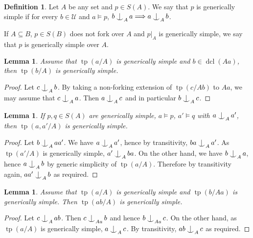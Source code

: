 \documentclass{amsart}
\makeatletter
\numberwithin{equation}{section}
\newtheorem{lemme}[thm]{Lemma}
\theoremstyle{definition}
\newtheorem{defi}[thm]{Definition}
\theoremstyle{mystyle}
\theoremstyle{remark}
\newcommand{\monster}{\mathcal U}
\DeclareMathOperator{\tp}{tp}
\DeclareMathOperator{\dcl}{dcl}
\def\indsym#1#2{%
 \setbox0=\hbox{$\m@th#1x$}%
 \kern\wd0%
 \hbox to 0pt{\hss$\m@th#1\mid$\hbox to 0pt{$\m@th#1^{#2}$\hss}\hss}%
 \lower.9\ht0\hbox to 0pt{\hss$\m@th#1\smile$\hss}%
 \kern\wd0}
\newcommand{\ind}[1][]{\mathop{\mathpalette\indsym{#1}}}
\makeatother
\begin{document}
\begin{defi}
Let $A$ be any set and $p\in S(A)$. We say that $p$ is generically simple if for every $b\in \monster$ and $a\models p$, $b\ind_{A} a \Longrightarrow a \ind_A b$.
\end{defi}

If $A\subseteq B$, $p\in S(B)$ does not fork over $A$ and $p|_A$ is generically simple, we say that $p$ is generically simple over $A$.

\begin{lemme}\label{lem_gensimpledcl}
Assume that $\tp(a/A)$ is generically simple and $b\in \dcl(Aa)$, then $\tp(b/A)$ is generically simple.
\end{lemme}
\begin{proof}
Let $c\ind_A b$. By taking a non-forking extension of $\tp(c/Ab)$ to $Aa$, we may assume that $c\ind_A a$. Then $a\ind_A c$ and in particular $b\ind_A c$.
\end{proof}

\begin{lemme}\label{lem_gensimpleprod}
If $p,q\in S(A)$ are generically simple, $a\models p$, $a'\models q$ with $a\ind_A a'$, then $\tp(a,a'/A)$ is generically simple.
\end{lemme}
\begin{proof}
Let $b \ind_A aa'$. We have $a \ind_A a'$, hence by transitivity, $ba \ind_A a'$. As $\tp(a'/A)$ is generically simple, $a' \ind_A ba$. On the other hand, we have $b \ind_A a$, hence $a \ind_A b$ by generic simplicity of $\tp(a/A)$. Therefore by transitivity again, $aa'\ind_A b$ as required.
\end{proof}

\begin{lemme}\label{lem_descent}
Assume that $\tp(a/A)$ is generically simple and $\tp(b/Aa)$ is generically simple. Then $\tp(ab/A)$ is generically simple.
\end{lemme}
\begin{proof}
Let $c \ind_A ab$. Then $c\ind_{Aa} b$ and hence $b\ind_{Aa} c$. On the other hand, as $\tp(a/A)$ is generically simple, $a \ind_A c$. By transitivity, $ab\ind_A c$ as required.
\end{proof}
\end{document}
